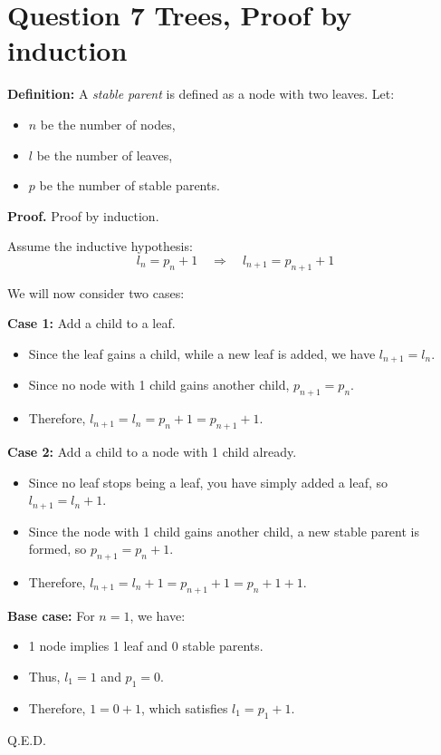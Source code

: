 \documentclass[11pt,fleqn]{article}
\theoremstyle{definition}
\theoremstyle{remark}
\begin{document}
\section{Question 7 Trees, Proof by induction}
    \textbf{Definition:} A \emph{stable parent} is defined as a node with two leaves. Let:
    \begin{itemize}
        \item \( n \) be the number of nodes,
        \item \( l \) be the number of leaves,
        \item \( p \) be the number of stable parents.
    \end{itemize}

    \noindent \textbf{Proof.} Proof by induction.

    Assume the inductive hypothesis:
    \[
    l_n = p_n + 1 \quad \Rightarrow \quad l_{n+1} = p_{n+1} + 1
    \]

    \noindent We will now consider two cases:

    \textbf{Case 1:} Add a child to a leaf.
    \begin{itemize}
        \item Since the leaf gains a child, while a new leaf is added, we have \( l_{n+1} = l_n \).
        \item Since no node with 1 child gains another child, \( p_{n+1} = p_n \).
        \item Therefore, \( l_{n+1} = l_n = p_n + 1 = p_{n+1} + 1 \).
    \end{itemize}

    \textbf{Case 2:} Add a child to a node with 1 child already.
    \begin{itemize}
        \item Since no leaf stops being a leaf, you have simply added a leaf, so \( l_{n+1} = l_n + 1 \).
        \item Since the node with 1 child gains another child, a new stable parent is formed, so \( p_{n+1} = p_n + 1 \).
        \item Therefore, \( l_{n+1} = l_n + 1 = p_{n+1} + 1 = p_n + 1 + 1 \).
    \end{itemize}

    \noindent \textbf{Base case:} For \( n = 1 \), we have:
    \begin{itemize}
        \item 1 node implies 1 leaf and 0 stable parents.
        \item Thus, \( l_1 = 1 \) and \( p_1 = 0 \).
        \item Therefore, \( 1 = 0 + 1 \), which satisfies \( l_1 = p_1 + 1 \).
    \end{itemize}

    \noindent Q.E.D.
\newpage
\clearpage
\end{document}
